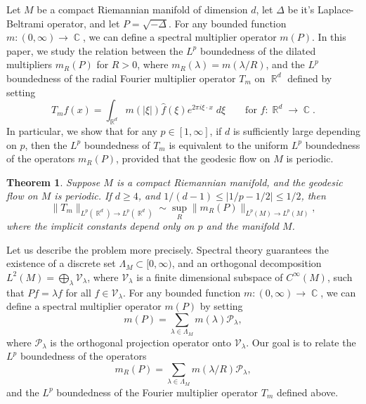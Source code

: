 \documentclass[dvipsnames,letterpaper,12pt]{article}
\DeclareMathOperator{\RR}{\mathbb{R}}
\DeclareMathOperator{\CC}{\mathbb{C}}
\newtheorem{theorem}{Theorem}
\begin{document}
Let $M$ be a compact Riemannian manifold of dimension $d$, let $\Delta$ be it's Laplace-Beltrami operator, and let $P = \sqrt{-\Delta}$. For any bounded function $m: (0,\infty) \to \CC$, we can define a spectral multiplier operator $m(P)$. In this paper, we study the relation between the $L^p$ boundedness of the dilated multipliers $m_R(P)$ for $R > 0$, where $m_R(\lambda) = m(\lambda / R)$, and the $L^p$ boundedness of the radial Fourier multiplier operator $T_m$ on $\RR^d$ defined by setting
%
\[ T_m f(x) = \int_{\RR^d} m(|\xi|) \widehat{f}(\xi) e^{2 \pi i \xi \cdot x}\; d\xi \quad\quad\text{for $f: \RR^d \to \CC$.} \]
%
In particular, we show that for any $p \in [1,\infty]$, if $d$ is sufficiently large depending on $p$, then the $L^p$ boundedness of $T_m$ is equivalent to the uniform $L^p$ boundedness of the operators $m_R(P)$, provided that the geodesic flow on $M$ is periodic.

\begin{theorem} \label{maintheoremprime}
    Suppose $M$ is a compact Riemannian manifold, and the geodesic flow on $M$ is periodic. If $d \geq 4$, and $1/(d-1) \leq |1/p - 1/2| \leq 1/2$, then
    \[ \| T_m \|_{L^p(\RR^d) \to L^p(\RR^d)} \sim \sup_R \| m_R(P) \|_{L^p(M) \to L^p(M)}, \]
    where the implicit constants depend only on $p$ and the manifold $M$.
\end{theorem}

Let us describe the problem more precisely. Spectral theory guarantees the existence of a discrete set $\Lambda_M \subset [0,\infty)$, and an orthogonal decomposition $L^2(M) = \bigoplus_\lambda \mathcal{V}_\lambda$, where $\mathcal{V}_\lambda$ is a finite dimensional subspace of $C^\infty(M)$, such that $P f = \lambda f$ for all $f \in \mathcal{V}_\lambda$. For any bounded function $m: (0,\infty) \to \CC$, we can define a spectral multiplier operator $m(P)$ by setting
%
\[ m(P) = \sum_{\lambda \in \Lambda_M} m \left( \lambda \right) \mathcal{P}_\lambda, \]
%
where $\mathcal{P}_\lambda$ is the orthogonal projection operator onto $\mathcal{V}_\lambda$. Our goal is to relate the $L^p$ boundedness of the operators
%
\[ m_R(P) = \sum_{\lambda \in \Lambda_M} m \left( \lambda / R \right) \mathcal{P}_\lambda, \]
%
and the $L^p$ boundedness of the Fourier multiplier operator $T_m$ defined above.
\end{document}
